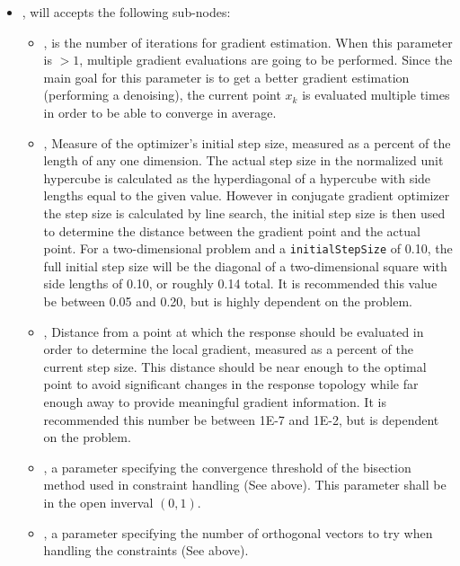 \begin{itemize}
\item {},  will accepts the following sub-nodes:
  \begin{itemize}
  \item {},  is the number of iterations for gradient estimation. When this
        parameter is $>1$, multiple gradient evaluations are going to be performed. Since the main goal for this parameter is to
        get a better gradient estimation (performing a denoising), the current point $x_k$ is evaluated multiple times in order to be able to
        converge in average.

  \item {},  Measure of the optimizer's initial step
    size, measured as a percent of the length of any one dimension. The actual step size in the normalized
    unit hypercube is calculated as the hyperdiagonal of a hypercube with side lengths equal to the given
    value. However in conjugate gradient optimizer the step size is calculated by line search, the initial
    step size is then used to determine the distance between the gradient point and the actual point.
    For a two-dimensional problem and a \texttt{initialStepSize} of 0.10, the full initial
    step size will be the diagonal of a two-dimensional square with side lengths of 0.10, or roughly 0.14
    total. It is recommended this value be between 0.05 and 0.20, but is highly dependent on the problem.
  \item {},  Distance from a point at which the
    response should be evaluated in order to determine the local gradient, measured as a percent of the
    current step size. This distance should be near enough to the optimal point to avoid significant changes
    in the response topology while far enough away to provide meaningful gradient information. It is
    recommended this number be between 1E-7 and 1E-2, but is dependent on the problem.
  \item {},  a parameter specifying the convergence threshold of the
  bisection method used in constraint handling (See above). This parameter shall be in the open inverval $(0,1)$.
  \item {},  a parameter specifying the number of orthogonal vectors to try
  when handling the constraints (See above).
  \end{itemize}
\end{itemize}


